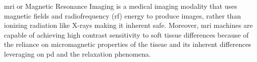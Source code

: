 %
%
%
%
%
%
%



\gls{mri} or Magnetic Resonance Imaging is a medical imaging modality that uses magnetic fields and radiofrequency (\gls{rf}) energy to produce images, rather than ionizing radiation like X-rays making it inherent safe. Moreover, \gls{mri} machines are capable of achieving high contrast sensitivity to soft tissue differences because of the reliance on micromagnetic properties of the tissue and its inherent differences leveraging on \gls{pd} and the relaxation phenomena.

